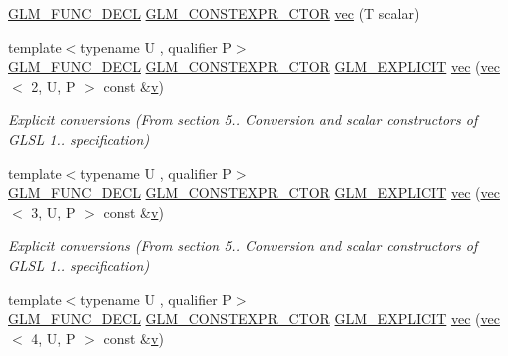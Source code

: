 \begin{DoxyCompactItemize}
\item 
\mbox{\hyperlink{setup_8hpp_ab2d052de21a70539923e9bcbf6e83a51}{G\+L\+M\+\_\+\+F\+U\+N\+C\+\_\+\+D\+E\+CL}} \mbox{\hyperlink{setup_8hpp_ad34178a09666081abdb573c14d1f4a5a}{G\+L\+M\+\_\+\+C\+O\+N\+S\+T\+E\+X\+P\+R\+\_\+\+C\+T\+OR}} \mbox{\hyperlink{structglm_1_1vec_3_011_00_01_t_00_01_q_01_4_a37e46740c8de9a5cf779508b05114859}{vec}} (T scalar)
\item 
{\footnotesize template$<$typename U , qualifier P$>$ }\\\mbox{\hyperlink{setup_8hpp_ab2d052de21a70539923e9bcbf6e83a51}{G\+L\+M\+\_\+\+F\+U\+N\+C\+\_\+\+D\+E\+CL}} \mbox{\hyperlink{setup_8hpp_ad34178a09666081abdb573c14d1f4a5a}{G\+L\+M\+\_\+\+C\+O\+N\+S\+T\+E\+X\+P\+R\+\_\+\+C\+T\+OR}} \mbox{\hyperlink{setup_8hpp_a6c74f5a5e7b134ab69023ff9a30d4d5d}{G\+L\+M\+\_\+\+E\+X\+P\+L\+I\+C\+IT}} \mbox{\hyperlink{structglm_1_1vec_3_011_00_01_t_00_01_q_01_4_a48714830341cbda646b425d42ae72314}{vec}} (\mbox{\hyperlink{structglm_1_1vec}{vec}}$<$ 2, U, P $>$ const \&\mbox{\hyperlink{_s_d_l__opengl_8h_a10a82eabcb59d2fcd74acee063775f90}{v}})
\begin{DoxyCompactList}\small\item\em Explicit conversions (From section 5.. Conversion and scalar constructors of G\+L\+SL 1.. specification) \end{DoxyCompactList}\item 
{\footnotesize template$<$typename U , qualifier P$>$ }\\\mbox{\hyperlink{setup_8hpp_ab2d052de21a70539923e9bcbf6e83a51}{G\+L\+M\+\_\+\+F\+U\+N\+C\+\_\+\+D\+E\+CL}} \mbox{\hyperlink{setup_8hpp_ad34178a09666081abdb573c14d1f4a5a}{G\+L\+M\+\_\+\+C\+O\+N\+S\+T\+E\+X\+P\+R\+\_\+\+C\+T\+OR}} \mbox{\hyperlink{setup_8hpp_a6c74f5a5e7b134ab69023ff9a30d4d5d}{G\+L\+M\+\_\+\+E\+X\+P\+L\+I\+C\+IT}} \mbox{\hyperlink{structglm_1_1vec_3_011_00_01_t_00_01_q_01_4_ab2af72d32392be4ad056d846d6552a85}{vec}} (\mbox{\hyperlink{structglm_1_1vec}{vec}}$<$ 3, U, P $>$ const \&\mbox{\hyperlink{_s_d_l__opengl_8h_a10a82eabcb59d2fcd74acee063775f90}{v}})
\begin{DoxyCompactList}\small\item\em Explicit conversions (From section 5.. Conversion and scalar constructors of G\+L\+SL 1.. specification) \end{DoxyCompactList}\item 
{\footnotesize template$<$typename U , qualifier P$>$ }\\\mbox{\hyperlink{setup_8hpp_ab2d052de21a70539923e9bcbf6e83a51}{G\+L\+M\+\_\+\+F\+U\+N\+C\+\_\+\+D\+E\+CL}} \mbox{\hyperlink{setup_8hpp_ad34178a09666081abdb573c14d1f4a5a}{G\+L\+M\+\_\+\+C\+O\+N\+S\+T\+E\+X\+P\+R\+\_\+\+C\+T\+OR}} \mbox{\hyperlink{setup_8hpp_a6c74f5a5e7b134ab69023ff9a30d4d5d}{G\+L\+M\+\_\+\+E\+X\+P\+L\+I\+C\+IT}} \mbox{\hyperlink{structglm_1_1vec_3_011_00_01_t_00_01_q_01_4_afe3da36b0ef8bf292c65f2846dc6db9a}{vec}} (\mbox{\hyperlink{structglm_1_1vec}{vec}}$<$ 4, U, P $>$ const \&\mbox{\hyperlink{_s_d_l__opengl_8h_a10a82eabcb59d2fcd74acee063775f90}{v}})

\end{DoxyCompactItemize}
